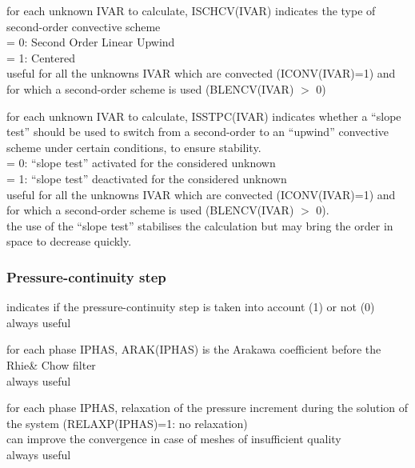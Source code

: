 {for each unknown IVAR to calculate, ISCHCV(IVAR) indicates the type of second-order
convective scheme\\
\hspace*{1.3cm}= 0: Second Order Linear Upwind\\
\hspace*{1.3cm}= 1: Centered\\
useful for all the unknowns IVAR which are convected (ICONV(IVAR)=1) and
for which a second-order scheme is used (BLENCV(IVAR) $>$ 0)}

{for each unknown IVAR to calculate, ISSTPC(IVAR) 
indicates whether a ``slope test'' should
be used to switch from a second-order to an ``upwind'' convective
scheme under certain conditions, to ensure stability.\\ 
\hspace*{1.3cm}= 0: ``slope test'' activated for the considered unknown\\
\hspace*{1.3cm}= 1: ``slope test'' deactivated for the considered unknown\\
useful for all the unknowns IVAR  which are convected (ICONV(IVAR)=1) and
for which a second-order scheme is used (BLENCV(IVAR) $>$ 0).\\
the use of the ``slope test'' stabilises the calculation but may bring
the order in space to decrease quickly.}

\subsubsection{Pressure-continuity step}


{indicates if the pressure-continuity step is taken into account (1) or
not (0)\\
always useful}

{for each phase IPHAS, ARAK(IPHAS) is the Arakawa coefficient before the
Rhie\& Chow filter\\   
always useful}

{for each phase IPHAS, relaxation of the pressure increment during the
solution of the system (RELAXP(IPHAS)=1: no relaxation)\\ 
can improve the convergence in case of
meshes of insufficient quality\\
always useful}

